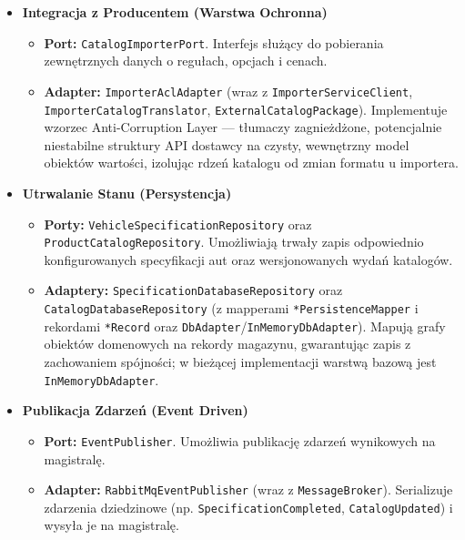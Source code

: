 \begin{itemize}
    \item \textbf{Integracja z Producentem (Warstwa Ochronna)}
    \begin{itemize}
        \item \textbf{Port:} \texttt{CatalogImporterPort}. Interfejs służący do pobierania zewnętrznych danych o regułach, opcjach i cenach.
        \item \textbf{Adapter:} \texttt{ImporterAclAdapter} (wraz z \texttt{ImporterServiceClient}, \texttt{ImporterCatalogTranslator}, \texttt{ExternalCatalogPackage}). Implementuje wzorzec Anti-Corruption Layer — tłumaczy zagnieżdżone, potencjalnie niestabilne struktury API dostawcy na czysty, wewnętrzny model obiektów wartości, izolując rdzeń katalogu od zmian formatu u importera.
    \end{itemize}

    \item \textbf{Utrwalanie Stanu (Persystencja)}
    \begin{itemize}
        \item \textbf{Porty:} \texttt{VehicleSpecificationRepository} oraz \texttt{ProductCatalogRepository}. Umożliwiają trwały zapis odpowiednio konfigurowanych specyfikacji aut oraz wersjonowanych wydań katalogów.
        \item \textbf{Adaptery:} \texttt{SpecificationDatabaseRepository} oraz \texttt{CatalogDatabaseRepository} (z mapperami \texttt{*PersistenceMapper} i rekordami \texttt{*Record} oraz \texttt{DbAdapter}/\texttt{InMemoryDbAdapter}). Mapują grafy obiektów domenowych na rekordy magazynu, gwarantując zapis z zachowaniem spójności; w bieżącej implementacji warstwą bazową jest \texttt{InMemoryDbAdapter}.
    \end{itemize}

    \item \textbf{Publikacja Zdarzeń (Event Driven)}
    \begin{itemize}
        \item \textbf{Port:} \texttt{EventPublisher}. Umożliwia publikację zdarzeń wynikowych na magistralę.
        \item \textbf{Adapter:} \texttt{RabbitMqEventPublisher} (wraz z \texttt{MessageBroker}). Serializuje zdarzenia dziedzinowe (np. \texttt{SpecificationCompleted}, \texttt{CatalogUpdated}) i wysyła je na magistralę.
    \end{itemize}
\end{itemize}

